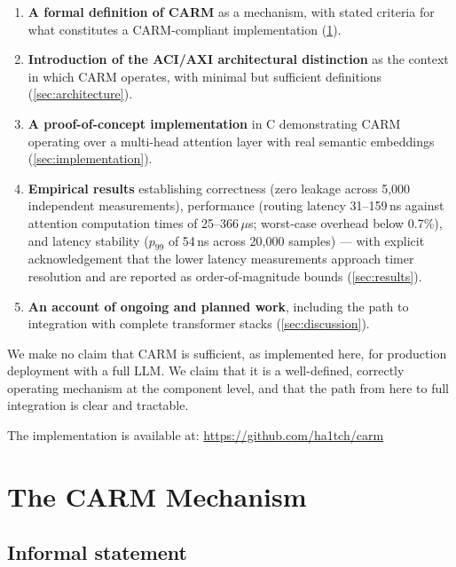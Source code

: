 \documentclass[11pt,a4paper]{article}
\theoremstyle{definition}
\begin{document}
\begin{enumerate}[label=\arabic*.]
  \item \textbf{A formal definition of CARM} as a mechanism, with stated criteria
        for what constitutes a CARM-compliant implementation
        (\cref{sec:mechanism}).

  \item \textbf{Introduction of the ACI/AXI architectural distinction} as the
        context in which CARM operates, with minimal but sufficient definitions
        (\cref{sec:architecture}).

  \item \textbf{A proof-of-concept implementation} in C demonstrating CARM
        operating over a multi-head attention layer with real semantic embeddings
        (\cref{sec:implementation}).

  \item \textbf{Empirical results} establishing correctness (zero leakage across
        5{,}000 independent measurements), performance (routing latency 31--159\,ns
        against attention computation times of 25--366\,$\mu$s; worst-case overhead
        below 0.7\%), and latency stability ($p_{99}$ of 54\,ns across 20{,}000
        samples) --- with explicit acknowledgement that the lower latency
        measurements approach timer resolution and are reported as
        order-of-magnitude bounds (\cref{sec:results}).

  \item \textbf{An account of ongoing and planned work}, including the path to
        integration with complete transformer stacks (\cref{sec:discussion}).
\end{enumerate}

We make no claim that CARM is sufficient, as implemented here, for production
deployment with a full LLM\@. We claim that it is a well-defined, correctly
operating mechanism at the component level, and that the path from here to full
integration is clear and tractable.

The implementation is available at:
\url{https://github.com/ha1tch/carm}

\section{The CARM Mechanism}
\label{sec:mechanism}

\subsection{Informal statement}
\end{document}
